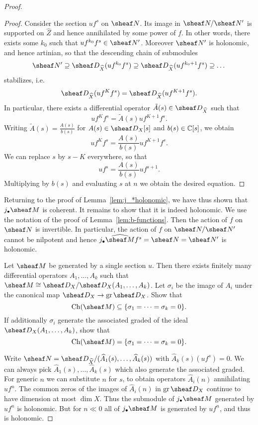 \documentclass[number-in-sections,a4paper]{notes}
\begin{document}
\begin{proof}
\begin{proof}
        Consider the section $uf^s$ on $\sheaf N$.
        Its image in $\sheaf N/\sheaf N'$ is supported on $\widehat Z$ and hence annihilated by some power of $f$.
        In other words, there exists some $k_0$ such that $uf^{k_0}f^s \in \sheaf N'$.
        Moreover  $\sheaf N'$ is holonomic, and hence artinian, so that the descending chain of submodules
        \[
            \sheaf N' \supseteq
            \sD_{\widehat X}(uf^{k_0}f^s) \supseteq
            \sD_{\widehat X}(uf^{k_0+1}f^s) \supseteq
            \dots
        \]
        stabilizes, i.e.
        \[
            \sD_{\widehat X}(uf^{K}f^s) =
            \sD_{\widehat X}(uf^{K+1}f^s).
        \]
        In particular, there exists a differential operator $\tilde A(s) \in \sD_{\widehat X}$ such that
        \[
            uf^{K}f^s = \tilde A(s)uf^{K+1}f^s.
        \]
        Writing $\tilde A(s) = \frac{A(s)}{b(s)}$ for $A(s) \in \sD_X[s]$ and $b(s) \in {\mathbb{C}}[s]$, we obtain
        \[
            uf^{K}f^s = \frac{A(s)}{b(s)}uf^{K+1}f^s.
        \]
        We can replace $s$ by $s-K$ everywhere, so that
        \[
            uf^{s} = \frac{A(s)}{b(s)}uf^{s+1}.
        \]
        Multiplying by $b(s)$ and evaluating $s$ at $n$ we obtain the desired equation.
    \end{proof}

    Returning to the proof of Lemma~\ref{lem:j_*holonomic}, we have thus shown that $j_\bullet\sheaf M$ is coherent.
    It remains to show that it is indeed holonomic.
    We use the notation of the proof of Lemma~\ref{lem:b-functions}.
    Then the action of $f$ on $\sheaf N$ is invertible.
    In particular, the action of $f$ on $\sheaf N/\sheaf N'$ cannot be nilpotent and hence $j_\bullet \widehat{\sheaf M}f^s = \sheaf N = \sheaf N'$ is holonomic.

    \begin{Exercise}
        Let $\sheaf M$ be generated by a single section $u$.
        Then there exists finitely many differential operators $A_1,\dots,A_k$ such that $\sheaf M \cong \sD_X/\sD_X(A_1,\dots,A_k)$.
        Let $\sigma_i$ be the image of $A_i$ under the canonical map $\sD_X \to \gr \sD_X$.
        Show that 
        \[
            \Ch(\sheaf M) \subseteq \{\sigma_1 = \dots = \sigma_k = 0\}.
        \]
        If additionally $\sigma_i$ generate the associated graded of the ideal $\sD_X(A_1,\dots,A_k)$, show that
        \[
            \Ch(\sheaf M) = \{\sigma_1 = \dots = \sigma_k = 0\}.
        \]
    \end{Exercise}

    Write $\sheaf N = \sD_{\widehat X}/(\widehat A_1(s), \dots, \widehat A_k(s))$ with $\widehat A_k(s) (uf^s) = 0$.
    We can always pick $\widehat A_1(s), \dots, \widehat A_k(s)$ which also generate the associated graded.
    For generic $n$ we can substitute $n$ for $s$, to obtain operators $\widehat A_i(n)$ annihilating $uf^n$.
    The common zeros of the images of $\widehat A_i(n)$ in $\gr \sD_X$ continue to have dimension at most $\dim X$.
    Thus the submodule of $j_\bullet\sheaf M$ generated by $uf^n$ is holonomic.
    But for $n \ll 0$ all of $j_\bullet\sheaf M$ is generated by $uf^n$, and thus is holonomic.
\end{proof}
\end{document}
